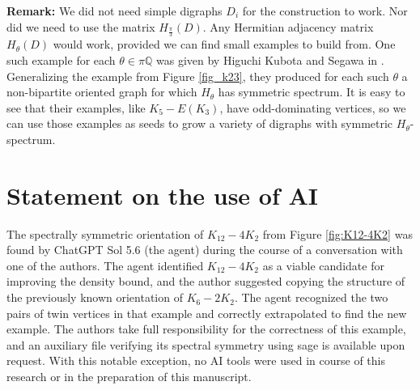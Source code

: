 \documentclass[11pt]{article}
\theoremstyle{plain}
\newcommand{\Hs}[0]{H_{\frac{\pi}{3}}}
\begin{document}
\noindent\textbf{Remark:} We did not need simple digraphs $D_i$ for the construction to work. Nor did we need to use the matrix $\Hs(D)$. Any Hermitian adjacency matrix $H_\theta(D)$ would work, provided we can find small examples to build from. One such example for each $\theta \in \pi \mathbb{Q}$ was given by Higuchi Kubota and Segawa in \cite{HKS24}. Generalizing the example from Figure \ref{fig_k23}, they produced for each such $\theta$ a non-bipartite oriented graph for which $H_\theta$ has symmetric spectrum. It is easy to see that their examples, like $K_5-E(K_3)$, have odd-dominating vertices, so we can use those examples as seeds to grow a variety of digraphs with symmetric $H_\theta$-spectrum.


\section*{Statement on the use of AI}
The spectrally symmetric orientation of $K_{12}-4K_2$ from Figure \ref{fig:K12-4K2} was found by ChatGPT Sol 5.6 (the agent) during the course of a conversation with one of the authors. The agent identified $K_{12}-4K_2$ as a viable candidate for improving the density bound, and the author suggested copying the structure of the previously known orientation of $K_{6}-2K_2$. The agent recognized the two pairs of twin vertices in that example and correctly extrapolated to find the new example. The authors take full responsibility for the correctness of this example, and an auxiliary file verifying its spectral symmetry using sage is available upon request. With this notable exception, no AI tools were used in course of this research or in the preparation of this manuscript.



\end{document}
